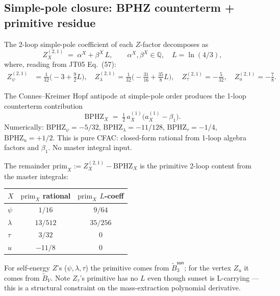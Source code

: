 \documentclass[11pt,a4paper]{article}
\theoremstyle{definition}
\theoremstyle{plain}
\begin{document}
\subsection{Simple-pole closure: BPHZ counterterm + primitive residue}
\label{sec:simple-pole-closure}

The 2-loop simple-pole coefficient of each $Z$-factor decomposes as
\begin{equation}\label{eq:simple-pole-form}
  Z_X^{(2,1)} \;=\; \alpha^X + \beta^X\,L,
  \qquad \alpha^X, \beta^X \in \mathbb{Q},\quad L = \ln(4/3),
\end{equation}
where, reading from JT05 Eq.~(57):
\begin{align*}
  Z_\psi^{(2,1)} &= \tfrac{1}{32}\bigl(-3 + \tfrac{9}{2}L\bigr),\quad
  Z_\lambda^{(2,1)} = \tfrac{1}{32}\bigl(-\tfrac{31}{16} + \tfrac{35}{8}L\bigr),\quad
  Z_\tau^{(2,1)} = -\tfrac{5}{32},\quad
  Z_u^{(2,1)} = -\tfrac{7}{8}.
\end{align*}

\begin{cfacbox}
The Connes--Kreimer Hopf antipode at simple-pole order produces the
1-loop counterterm contribution
\begin{equation}\label{eq:bphz-simple}
  \boxed{\;
    \mathrm{BPHZ}_X
    \;=\; \tfrac{1}{2}\,a_X^{(1)}\bigl(a_X^{(1)} - \beta_1\bigr).
  \;}
\end{equation}
Numerically:
$\mathrm{BPHZ}_\psi = -5/32$,
$\mathrm{BPHZ}_\lambda = -11/128$,
$\mathrm{BPHZ}_\tau = -1/4$,
$\mathrm{BPHZ}_u = +1/2$.
This is pure CFAC: closed-form rational from 1-loop algebra factors
and $\beta_1$.  No master integral input.
\end{cfacbox}

\begin{stdbox}
The remainder $\mathrm{prim}_X := Z_X^{(2,1)} - \mathrm{BPHZ}_X$ is
the primitive 2-loop content from the master integrals:
\begin{center}
\begin{tabular}{@{}lcc@{}}
\toprule
$X$ & $\mathrm{prim}_X$ rational & $\mathrm{prim}_X$ $L$-coeff\\
\midrule
$\psi$    & $1/16$    & $9/64$\\
$\lambda$ & $13/512$  & $35/256$\\
$\tau$    & $3/32$    & $0$\\
$u$       & $-11/8$   & $0$\\
\bottomrule
\end{tabular}
\end{center}
For self-energy $Z$'s ($\psi, \lambda, \tau$) the primitive comes
from $\tilde B_3^{\textsf{sun}}$; for the vertex $Z_u$ it comes from
$\tilde B_V$.  Note $Z_\tau$'s primitive has no $L$ even though
sunset is L-carrying --- this is a structural constraint on the
mass-extraction polynomial derivative.
\end{stdbox}
\end{document}
